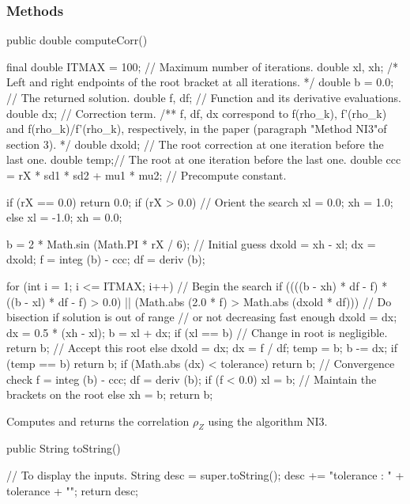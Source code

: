 \subsubsection* {Methods}
\begin{code}

   public double computeCorr() \begin{hide}
   {
      final double ITMAX = 100; // Maximum number of iterations.
      double xl, xh;  /* Left and right endpoints of the root bracket at
			 all iterations. */
      double b = 0.0; // The returned solution.
      double f, df;   // Function and its derivative evaluations.
      double dx;      // Correction term.
      /** f, df, dx correspond to f(rho_k), f'(rho_k) and f(rho_k)/f'(rho_k),
          respectively, in the paper (paragraph "Method NI3"of section 3). */
      double dxold; // The root correction at one iteration before the last one.
      double temp;// The root at one iteration before the last one.
      double ccc = rX * sd1 * sd2 + mu1 * mu2; // Precompute constant.

      if (rX == 0.0)
         return 0.0;
      if (rX > 0.0) {              // Orient the search
         xl = 0.0;
         xh = 1.0;
      } else {
         xl = -1.0;
         xh = 0.0;
      }

      b = 2 * Math.sin (Math.PI * rX / 6); // Initial guess
      dxold = xh - xl;
      dx = dxold;
      f = integ (b) - ccc;
      df = deriv (b);

      for (int i = 1; i <= ITMAX; i++) { // Begin the search
         if ((((b - xh) * df - f) * ((b - xl) * df - f) > 0.0)
               || (Math.abs (2.0 * f) > Math.abs (dxold * df))) {
            // Do bisection if solution is out of range
            // or not decreasing fast enough
            dxold = dx;
            dx = 0.5 * (xh - xl);
            b = xl + dx;
            if (xl == b)      // Change in root is negligible.
               return b;      // Accept this root
         } else {
            dxold = dx;
            dx = f / df;
            temp = b;
            b -= dx;
            if (temp == b)
               return b;
         }
         if (Math.abs (dx) < tolerance)
            return b;          // Convergence check
         f = integ (b) - ccc;
         df = deriv (b);
         if (f < 0.0)
            xl = b;            // Maintain the brackets on the root
         else
            xh = b;
      }
      return b;
   }\end{hide}
\end{code}
\begin{tabb} Computes and returns the correlation $\rho_Z$ using the algorithm NI3.
\end{tabb}
\begin{code}

   public String toString()\begin{hide}
   {
    // To display the inputs.
      String desc = super.toString();
      desc += "tolerance : " + tolerance + "\n";
      return desc;
   }\end{hide}
\end{code}

\begin{code}\begin{hide}
}\end{hide}
\end{code}
